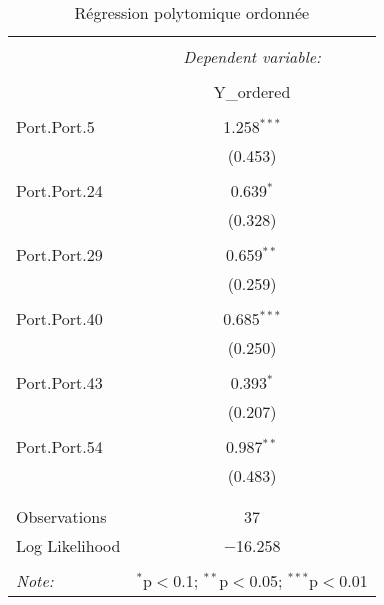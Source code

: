 
\begin{table}[!htbp] \centering 
  \caption{Régression polytomique ordonnée} 
  \label{} 
\begin{tabular}{@{\extracolsep{5pt}}lc} 
\\[-1.8ex]\hline 
\hline \\[-1.8ex] 
 & \multicolumn{1}{c}{\textit{Dependent variable:}} \\ 
\cline{2-2} 
\\[-1.8ex] & Y\_ordered \\ 
\hline \\[-1.8ex] 
 Port.Port.5 & 1.258$^{***}$ \\ 
  & (0.453) \\ 
  & \\ 
 Port.Port.24 & 0.639$^{*}$ \\ 
  & (0.328) \\ 
  & \\ 
 Port.Port.29 & 0.659$^{**}$ \\ 
  & (0.259) \\ 
  & \\ 
 Port.Port.40 & 0.685$^{***}$ \\ 
  & (0.250) \\ 
  & \\ 
 Port.Port.43 & 0.393$^{*}$ \\ 
  & (0.207) \\ 
  & \\ 
 Port.Port.54 & 0.987$^{**}$ \\ 
  & (0.483) \\ 
  & \\ 
\hline \\[-1.8ex] 
Observations & 37 \\ 
Log Likelihood & $-$16.258 \\ 
\hline 
\hline \\[-1.8ex] 
\textit{Note:}  & \multicolumn{1}{r}{$^{*}$p$<$0.1; $^{**}$p$<$0.05; $^{***}$p$<$0.01} \\ 
\end{tabular} 
\end{table} 
